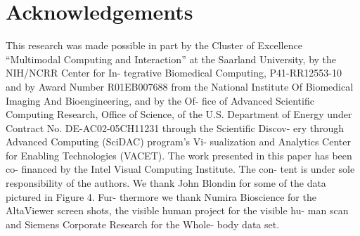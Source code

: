 \section{Acknowledgements}
This research was made possible in part by the Cluster
of Excellence “Multimodal Computing and Interaction” at
the Saarland University, by the NIH/NCRR Center for In-
tegrative Biomedical Computing, P41-RR12553-10 and by
Award Number R01EB007688 from the National Institute
Of Biomedical Imaging And Bioengineering, and by the Of-
fice of Advanced Scientific Computing Research, Office of
Science, of the U.S. Department of Energy under Contract
No. DE-AC02-05CH11231 through the Scientific Discov-
ery through Advanced Computing (SciDAC) program’s Vi-
sualization and Analytics Center for Enabling Technologies
(VACET). The work presented in this paper has been co-
financed by the Intel Visual Computing Institute. The con-
tent is under sole responsibility of the authors. We thank
John Blondin for some of the data pictured in Figure 4. Fur-
thermore we thank Numira Bioscience for the AltaViewer
screen shots, the visible human project for the visible hu-
man scan and Siemens Corporate Research for the Whole-
body data set.
